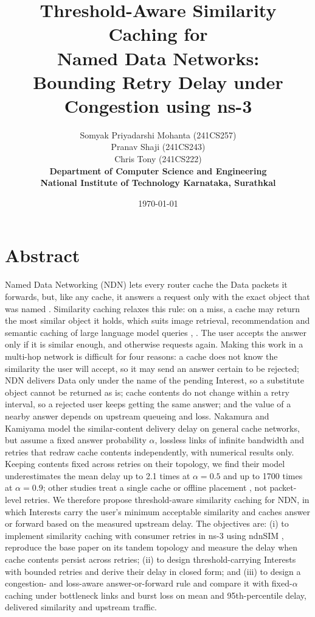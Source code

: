 \documentclass[12pt,a4paper]{article}
\title{\textbf{Threshold-Aware Similarity Caching for\\
Named Data Networks:\\
Bounding Retry Delay under Congestion using ns-3}}
\author{Somyak Priyadarshi Mohanta (241CS257)\\
Pranav Shaji (241CS243)\\
Chris Tony (241CS222)\\
\textbf{Department of Computer Science and Engineering}\\
\textbf{National Institute of Technology Karnataka, Surathkal}}
\date{\today}
\begin{document}
\maketitle

\section*{Abstract}
Named Data Networking (NDN) lets every router cache the Data packets it forwards, but, like any
cache, it answers a request only with the exact object that was named \cite{ndn}. Similarity
caching relaxes this rule: on a miss, a cache may return the most similar object it holds, which
suits image retrieval, recommendation and semantic caching of large language model queries
\cite{neglia}, \cite{vcache}. The user accepts the answer only if it is similar enough, and
otherwise requests again. Making this work in a multi-hop network is difficult for four reasons: a
cache does not know the similarity the user will accept, so it may send an answer certain to be
rejected; NDN delivers Data only under the name of the pending Interest, so a substitute object
cannot be returned as is; cache contents do not change within a retry interval, so a rejected user
keeps getting the same answer; and the value of a nearby answer depends on upstream queueing and
loss. Nakamura and Kamiyama \cite{nakamura} model the similar-content delivery delay on general
cache networks, but assume a fixed answer probability $\alpha$, lossless links of infinite
bandwidth and retries that redraw cache contents independently, with numerical results only.
Keeping contents fixed across retries on their topology, we find their model underestimates the
mean delay up to 2.1 times at $\alpha = 0.5$ and up to 1700 times at $\alpha = 0.9$; other studies
treat a single cache \cite{neglia} or offline placement \cite{garetto}, not packet-level retries.
We therefore
propose threshold-aware similarity caching for NDN, in which Interests carry the user's minimum
acceptable similarity and caches answer or forward based on the measured upstream delay. The
objectives are: (i) to implement similarity caching with consumer retries in ns-3 using ndnSIM
\cite{ndnsim}, reproduce the base paper on its tandem topology and measure the delay when cache
contents persist across retries; (ii) to design threshold-carrying Interests with bounded retries
and derive their delay in closed form; and (iii) to design a congestion- and loss-aware
answer-or-forward rule and compare it with fixed-$\alpha$ caching under bottleneck links and burst
loss on mean and 95th-percentile delay, delivered similarity and upstream traffic.
\end{document}
